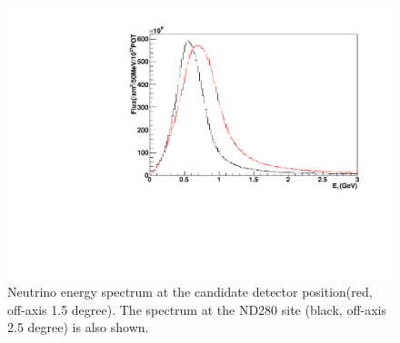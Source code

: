 \begin{figure}[tbhp]
\begin{center}
\includegraphics[width=0.6\linewidth, angle=270]{fig/b2_nd280_fluxes.pdf}
\end{center}
\caption{
Neutrino energy spectrum at the candidate detector position(red, off-axis 1.5 degree).
The spectrum at the ND280 site (black, off-axis 2.5 degree) is also shown.
}
\label{fig:b2flux}
\end{figure}

